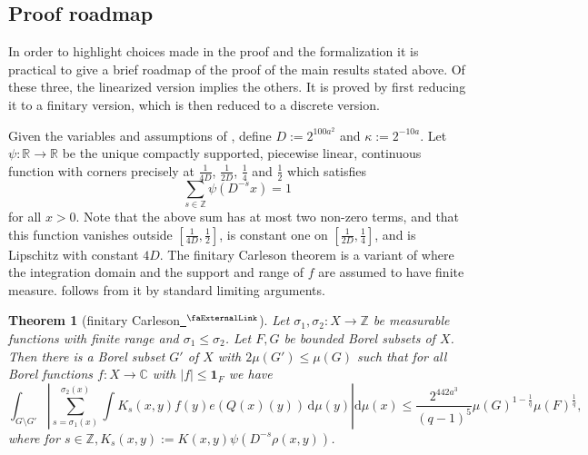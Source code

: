 \documentclass[12pt, reqno]{amsart}
\newcommand*{\complex}{\mathbb{C}} %
\newcommand*{\real}{\mathbb{R}} %
\newcommand{\extlink}{~\ensuremath{{}^\text{\faExternalLink}}}
\theoremstyle{definition}
\theoremstyle{plain}
\newtheorem{theorem}{Theorem}[subsection]
\newcommand{\tQ}{{Q}}
\begin{document}
\subsection{Proof roadmap}\label{subsec:proof-sketch}

In order to highlight choices made in the proof and the formalization it is practical to give a brief roadmap
of the proof of the main results stated above.
Of these three, the linearized version  implies the others. It is proved by first reducing it to a finitary version, which is then reduced to a discrete version.

Given the variables and assumptions of , define $D := 2^{100a^2}$ and $\kappa := 2^{-10a}.$
Let $\psi\colon\real \to\real$ be the unique compactly supported, piecewise linear, continuous function with corners precisely at $\frac 1{4D}$, $\frac 1{2D}$, $\frac 14$ and $\frac 12$ which satisfies
\begin{equation*}
    \sum_{s\in \mathbb{Z}} \psi(D^{-s}x)=1
\end{equation*}
for all $x>0$. Note that the above sum has at most two non-zero terms, and that this function vanishes outside $[\frac1{4D},\frac 12]$, is constant one on
$[\frac1{2D},\frac 14]$, and is Lipschitz with constant $4D$. The finitary Carleson theorem is a variant of  where the integration domain and the support and range of $f$ are assumed to have finite measure.  follows from it by standard limiting arguments.

\begin{theorem}[finitary Carleson\href{https://github.com/fpvandoorn/carleson/blob/AFM-frozen/Carleson/FinitaryCarleson.lean\#L110-L113}{\extlink}]
\label{finitary-Carleson}
Let ${\sigma_1},\sigma_2\colon X\to \mathbb{Z}$ be measurable functions with finite range and ${\sigma_1}\leq \sigma_2$. Let $F,G$ be bounded Borel subsets of $X$. Then there is a Borel subset $G'$ of $X$ with $2\mu(G')\leq \mu(G)$ such that
for all Borel functions $f\colon X\to \complex$ with $|f|\le \mathbf{1}_F$ we have
\begin{equation*}
    \int_{G \setminus G'} \left|\sum_{s={\sigma_1}(x)}^{{\sigma_2}(x)} \int K_s(x,y) f(y) e(\tQ(x)(y)) \, \mathrm{d}\mu(y) \right| \mathrm{d}\mu(x)
    \le \frac{2^{442a^3}}{(q-1)^5} \mu(G)^{1-\frac{1}{q}} \mu(F)^{\frac 1 q},
\end{equation*}
where for $s \in \mathbb{Z}, K_s(x,y) := K(x,y)\psi(D^{-s}\rho(x,y))$.
\end{theorem}
\end{document}
